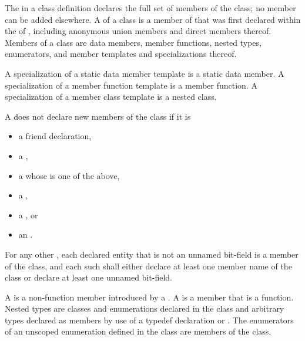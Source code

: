 \pnum
{}%
The  in a class definition declares the
full set of members of the class; no member can be added elsewhere.
A  of a class  is a member of 
that was first declared within the  of ,
including anonymous union members and direct members thereof.
Members of a class are data members, member
functions, nested types, enumerators,
and member templates and specializations thereof.
\begin{note}
A specialization of a static data member template is a static data member.
A specialization of a member function template is a member function.
A specialization of a member class template is a nested class.
\end{note}

\pnum
A  does not declare new members of the class
if it is
\begin{itemize}
\item a friend declaration,
\item a ,
\item a  whose  is one of the above,
\item a ,
\item a , or
\item an .
\end{itemize}
For any other ,
each declared entity
that is not an unnamed bit-field
is a member of the class,
and each such 
shall either
declare at least one member name of the class
or declare at least one unnamed bit-field.

\pnum
A  is a non-function member introduced by a
.
A  is a member that is a function.
Nested types are classes and
enumerations declared in the class and arbitrary types
declared as members by use of a typedef declaration
or .
The enumerators of an unscoped enumeration defined in the class
are members of the class.

